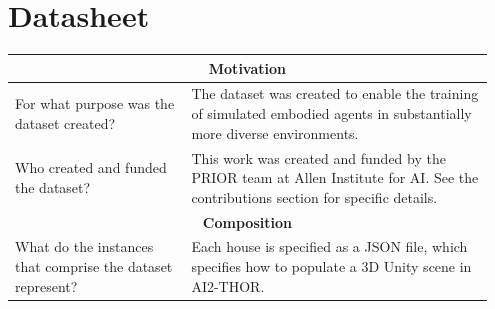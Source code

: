 \section{\env{} Datasheet}
\label{sec:datasheet}

\begin{longtable}{p{0.35\linewidth} |p{0.6\linewidth} }
    \bottomrule
        \multicolumn{2}{c}{\rule{0in}{0.2in}\textbf{Motivation}\vspace{0.10in}}\\
    \toprule
     For what purpose was the dataset created? & The dataset was created to enable the training of simulated embodied agents in substantially more diverse environments.\\[0.15in]
     \midrule
     Who created and funded the dataset? &
      This work was created and funded by the PRIOR team at Allen Institute for AI. See the contributions section for specific details.\\
     
    \bottomrule
        \multicolumn{2}{c}{\rule{0in}{0.2in}\textbf{Composition}\vspace{0.10in}}\\
    \toprule
    What do the instances that comprise the dataset represent? & Each house is specified as a JSON file, which specifies how to populate a 3D Unity scene in AI2-THOR. 



\end{longtable}
